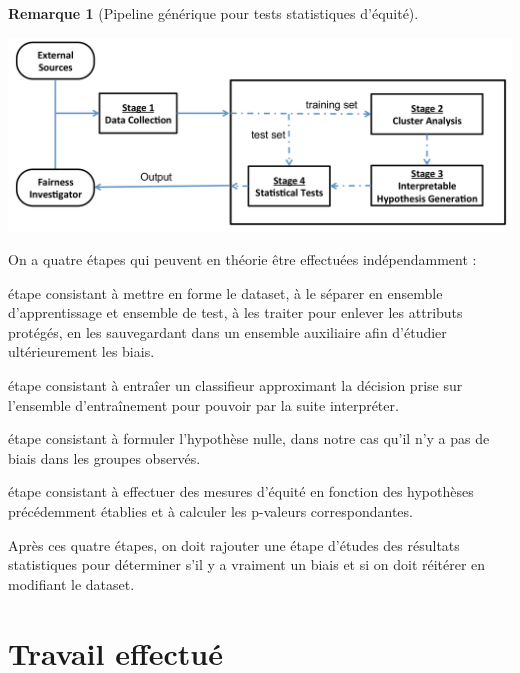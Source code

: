 \documentclass[draft]{article}
\theoremstyle{definition}
\newtheorem{myRem}{Remarque}
\begin{document}
\begin{myRem}[Pipeline générique pour tests statistiques d'équité] \hfill
  \begin{center}
    \includegraphics[width=\textwidth]{genericPipeline}
  \end{center}
  On a quatre étapes qui peuvent en théorie être effectuées indépendamment :
  \begin{description}[style=nextline]
  \item[1. Acquisition de donnée]
    étape consistant à mettre en forme le dataset, à le séparer en ensemble d'apprentissage et ensemble de test, à les traiter pour enlever les attributs protégés, en les sauvegardant dans un ensemble auxiliaire afin d'étudier ultérieurement les biais.

  \item[2. Partionnement de données et apprentissage]
    étape consistant à entraîer un classifieur approximant la décision prise sur l'ensemble d'entraînement pour pouvoir par la suite interpréter.

  \item[3. Génération d'hypothèse interprétable]
    étape consistant à formuler l'hypothèse nulle, dans notre cas qu'il n'y a pas de biais dans les groupes observés.

  \item[4. Tests statistiques]
    étape consistant à effectuer des mesures d'équité en fonction des hypothèses précédemment établies et à calculer les p-valeurs correspondantes.
  \end{description}

  Après ces quatre étapes, on doit rajouter une étape d'études des résultats statistiques pour déterminer s'il y a vraiment un biais et si on doit réitérer en modifiant le dataset.
\end{myRem}



\section{Travail effectué}
\end{document}
